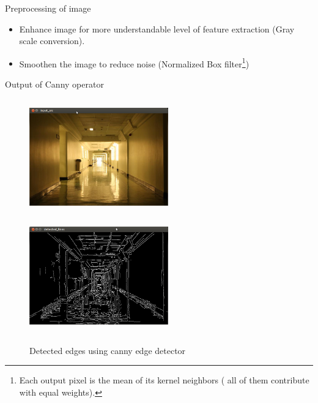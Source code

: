 \documentclass[8pt]{beamer}
\begin{document}

\begin{frame}{Preprocessing of image}
\begin{itemize}
  \setlength\itemsep{1em}
 \item Enhance image for more understandable level of feature extraction (Gray scale conversion).
 \item Smoothen the image to reduce noise (Normalized Box filter\footnote{Each output pixel is the mean of its kernel neighbors ( all of them
contribute with equal weights).})
\end{itemize}

\end{frame}



\begin{frame}{Output of Canny operator}
 \begin{figure}
\includegraphics[width=6cm, height=5cm]{images/inputimage.png}%
\includegraphics[width=6cm, height=5cm]{images/detected_edges.png}%
\caption{Detected edges using canny edge detector}%
\label{fig:detectedegdes}
\end{figure}
\end{frame}


\end{document}
